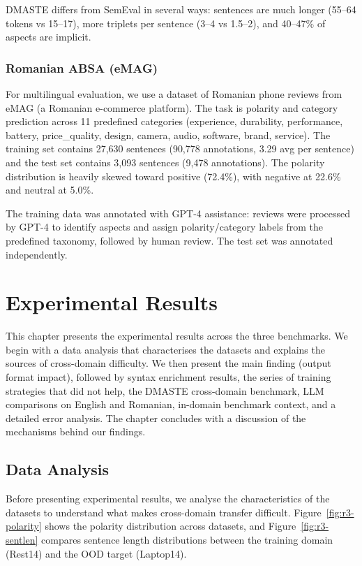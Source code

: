 \documentclass[12pt,a4paper]{report}
\begin{document}
DMASTE differs from SemEval in several ways: sentences are much longer (55--64 tokens vs 15--17), more triplets per sentence (3--4 vs 1.5--2), and 40--47\% of aspects are implicit.

\subsection{Romanian ABSA (eMAG)}

For multilingual evaluation, we use a dataset of Romanian phone reviews from eMAG (a Romanian e-commerce platform). The task is polarity and category prediction across 11 predefined categories (experience, durability, performance, battery, price\_quality, design, camera, audio, software, brand, service). The training set contains 27,630 sentences (90,778 annotations, 3.29 avg per sentence) and the test set contains 3,093 sentences (9,478 annotations). The polarity distribution is heavily skewed toward positive (72.4\%), with negative at 22.6\% and neutral at 5.0\%.

The training data was annotated with GPT-4 assistance: reviews were processed by GPT-4 to identify aspects and assign polarity/category labels from the predefined taxonomy, followed by human review. The test set was annotated independently.



\chapter{Experimental Results}\label{ch:results}

This chapter presents the experimental results across the three benchmarks. We begin with a data analysis that characterises the datasets and explains the sources of cross-domain difficulty. We then present the main finding (output format impact), followed by syntax enrichment results, the series of training strategies that did not help, the DMASTE cross-domain benchmark, LLM comparisons on English and Romanian, in-domain benchmark context, and a detailed error analysis. The chapter concludes with a discussion of the mechanisms behind our findings.

\section{Data Analysis}\label{sec:data-analysis}

Before presenting experimental results, we analyse the characteristics of the datasets to understand what makes cross-domain transfer difficult. Figure~\ref{fig:r3-polarity} shows the polarity distribution across datasets, and Figure~\ref{fig:r3-sentlen} compares sentence length distributions between the training domain (Rest14) and the OOD target (Laptop14).
\end{document}
